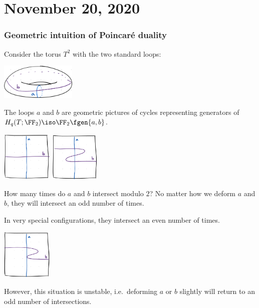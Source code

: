 \documentclass{standalone}
\begin{document}
\chapter{November 20, 2020}
\subsection{Geometric intuition of Poincar\'e duality}
Consider the torus \(T^2\) with the two standard loops:
\begin{center}
  \includegraphics[width=0.27\textwidth]{18_905-201120-1.png}
\end{center}
The loops \(a\) and \(b\) are geometric pictures of cycles
representing generators of \(H_q(T; \FF_2) \iso \FF_2\fgen{a,b}\).

\begin{center}
  \includegraphics[width=0.18\textwidth]{18_905-201120-2.png}
  \qquad
  \includegraphics[width=0.18\textwidth]{18_905-201120-3.png}
\end{center}
How many times do \(a\) and \(b\) intersect modulo \(2\)?
No matter how we deform \(a\) and \(b\),
they will intersect an odd number of times.

In very special configurations, they intersect an even number of times.
\begin{center}
  \includegraphics[width=0.18\textwidth]{18_905-201120-4.png}
\end{center}
However, this situation is unstable, i.e.\ deforming \(a\) or \(b\) slightly
will return to an odd number of intersections.
\end{document}
